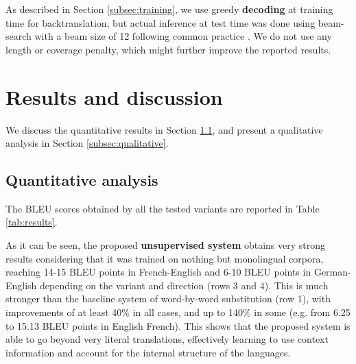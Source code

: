 \documentclass{article} \usepackage{iclr2018_conference,times}
\begin{document}
As described in Section \ref{subsec:training}, we use greedy \textbf{decoding} at training time for backtranslation, but actual inference at test time was done using beam-search with a beam size of 12 following common practice \citep{sutskever2014sequence,sennrich2016improving,sennrich2016neural,he2016dual}. We do not use any length or coverage penalty, which might further improve the reported results.


\section{Results and discussion} 
\label{sec:results}

We discuss the quantitative results in Section \ref{subsec:quantitative}, and present a qualitative analysis in Section \ref{subsec:qualitative}.

\subsection{Quantitative analysis} \label{subsec:quantitative}

The BLEU scores obtained by all the tested variants are reported in Table \ref{tab:results}.

As it can be seen, the proposed \textbf{unsupervised system} obtains very strong results considering that it was trained on nothing but monolingual corpora, reaching 14-15 BLEU points in French-English and 6-10 BLEU points in German-English depending on the variant and direction (rows 3 and 4). This is much stronger than the baseline system of word-by-word substitution (row 1), with improvements of at least 40\% in all cases, and up to 140\% in some (e.g. from 6.25 to 15.13 BLEU points in English  French). This shows that the proposed system is able to go beyond very literal translations, effectively learning to use context information and account for the internal structure of the languages.
\end{document}
